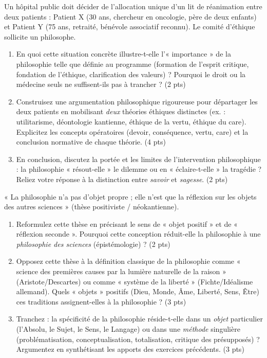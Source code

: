 \documentclass[11pt]{article}
\begin{document}
\begin{exercice}
Un hôpital public doit décider de l'allocation unique d'un lit de réanimation entre deux patients : Patient X (30 ans, chercheur en oncologie, père de deux enfants) et Patient Y (75 ans, retraité, bénévole associatif reconnu). Le comité d'éthique sollicite un philosophe.
\begin{enumerate}
    \item En quoi cette situation concrète illustre-t-elle l'« importance » de la philosophie telle que définie au programme (formation de l'esprit critique, fondation de l'éthique, clarification des valeurs) ? Pourquoi le droit ou la médecine seuls ne suffisent-ils pas à trancher ? (2 pts)
    \item Construisez une argumentation philosophique rigoureuse pour départager les deux patients en mobilisant \textit{deux} théories éthiques distinctes (ex. : utilitarisme, déontologie kantienne, éthique de la vertu, éthique du care). Explicitez les concepts opératoires (devoir, conséquence, vertu, care) et la conclusion normative de chaque théorie. (4 pts)
    \item En conclusion, discutez la portée et les limites de l'intervention philosophique : la philosophie « résout-elle » le dilemme ou en « éclaire-t-elle » la tragédie ? Reliez votre réponse à la distinction entre \textit{savoir} et \textit{sagesse}. (2 pts)
\end{enumerate}
\end{exercice}

\begin{exercice}
« La philosophie n'a pas d'objet propre ; elle n'est que la réflexion sur les objets des autres sciences » (thèse positiviste / néokantienne).
\begin{enumerate}
    \item Reformulez cette thèse en précisant le sens de « objet positif » et de « réflexion seconde ». Pourquoi cette conception réduit-elle la philosophie à une \textit{philosophie des sciences} (épistémologie) ? (2 pts)
    \item Opposez cette thèse à la définition classique de la philosophie comme « science des premières causes par la lumière naturelle de la raison » (Aristote/Descartes) ou comme « système de la liberté » (Fichte/Idéalisme allemand). Quels « objets » positifs (Dieu, Monde, Âme, Liberté, Sens, Être) ces traditions assignent-elles à la philosophie ? (3 pts)
    \item Tranchez : la spécificité de la philosophie réside-t-elle dans un \textit{objet} particulier (l'Absolu, le Sujet, le Sens, le Langage) ou dans une \textit{méthode} singulière (problématisation, conceptualisation, totalisation, critique des présupposés) ? Argumentez en synthétisant les apports des exercices précédents. (3 pts)
\end{enumerate}
\end{exercice}
\end{document}
